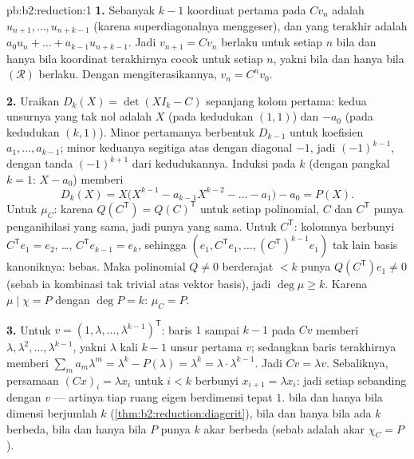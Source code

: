 \begin{solution}{pb:b2:reduction:1}
\textbf{1.} Sebanyak $k - 1$ koordinat pertama pada $Cv_n$ adalah
$u_{n+1}, \dots, u_{n+k-1}$ (karena superdiagonalnya menggeser), dan yang
terakhir adalah $a_0 u_n + \dots + a_{k-1}u_{n+k-1}$. Jadi $v_{n+1} =
Cv_n$ berlaku untuk setiap $n$ bila dan hanya bila koordinat terakhirnya
cocok untuk setiap $n$, yakni bila dan hanya bila $(\mathcal R)$
berlaku. Dengan mengiterasikannya, $v_n = C^nv_0$.

\textbf{2.} Uraikan $D_k(X) = \det(XI_k - C)$ sepanjang kolom
pertama: kedua unsurnya yang tak nol adalah $X$ (pada kedudukan $(1,1)$)
dan $-a_0$ (pada kedudukan $(k,1)$). Minor pertamanya berbentuk
$D_{k-1}$ untuk koefisien $a_1, \dots, a_{k-1}$; minor keduanya
segitiga atas dengan diagonal $-1$, jadi  $(-1)^{k-1}$,
dengan tanda $(-1)^{k+1}$ dari kedudukannya. Induksi pada $k$
(dengan pangkal $k = 1$: $X - a_0$) memberi
\[
D_k(X) = X\bigl(X^{k-1} - a_{k-1}X^{k-2} - \dots - a_1\bigr) -
a_0 = P(X).
\]
Untuk $\mu_C$: karena $Q(C^{\mathsf T}) = Q(C)^{\mathsf T}$ untuk setiap
polinomial, $C$ dan $C^{\mathsf T}$ punya penganihilasi yang sama, jadi
punya  yang sama. Untuk $C^{\mathsf T}$: kolomnya
berbunyi $C^{\mathsf T}e_1 = e_2$, \dots, $C^{\mathsf
T}e_{k-1} = e_k$, sehingga $(e_1, C^{\mathsf T}e_1, \dots, (C^{\mathsf
T})^{k-1}e_1)$ tak lain basis kanoniknya: bebas. Maka polinomial $Q
\neq 0$ berderajat $< k$ punya $Q(C^{\mathsf T})e_1 \neq 0$
(sebab ia kombinasi tak trivial atas vektor basis), jadi $\deg\mu \geq
k$. Karena $\mu \mid \chi = P$ dengan $\deg P = k$: $\mu_C = P$.

\textbf{3.} Untuk $v = (1, \lambda, \dots, \lambda^{k-1})^{\mathsf
T}$: baris $1$ sampai $k-1$ pada $Cv$ memberi $\lambda, \lambda^2, \dots,
\lambda^{k-1}$, yakni $\lambda$ kali $k - 1$ unsur pertama
$v$; sedangkan baris terakhirnya memberi $\sum_m a_m\lambda^m = \lambda^k -
P(\lambda) = \lambda^k = \lambda\cdot\lambda^{k-1}$. Jadi $Cv =
\lambda v$. Sebaliknya, persamaan $(Cx)_i = \lambda x_i$ untuk
$i < k$ berbunyi $x_{i+1} = \lambda x_i$: jadi setiap 
sebanding dengan $v$ --- artinya tiap ruang eigen berdimensi tepat
$1$.  bila dan hanya bila dimensi 
berjumlah $k$ (\cref{thm:b2:reduction:diagcrit}), bila dan hanya bila ada
$k$  berbeda, bila dan hanya bila $P$ punya $k$ akar berbeda
(sebab  adalah akar $\chi_C = P$).


\end{solution}
